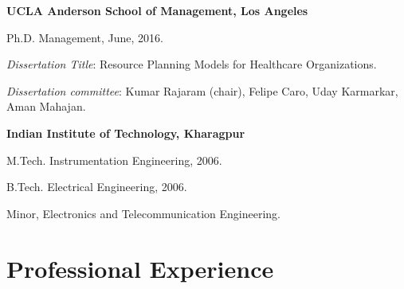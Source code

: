 \documentclass[11pt,a4paper]{article}
\renewenvironment{itemize}{
	\begin{list}{}{
			\setlength{\leftmargin}{1.5em}
		}
	}{
\end{list}
}
\begin{document}
	\begin{itemize}
		\item \textbf{UCLA Anderson School of Management, Los Angeles}
		\begin{itemize}
			\item Ph.D. Management,  June, 2016.
			\item \emph{Dissertation Title}: Resource Planning Models for Healthcare Organizations.
			\item \emph{Dissertation committee}: Kumar Rajaram (chair), Felipe Caro, Uday Karmarkar, {Aman Mahajan}.
		\end{itemize}
		\item \textbf{Indian Institute of Technology, Kharagpur}
		\begin{itemize}
			\item M.Tech. Instrumentation Engineering, 2006.
			\item B.Tech. Electrical Engineering, 2006.
			\begin{itemize}
			\item[\textendash] Minor, Electronics and Telecommunication Engineering.
		\end{itemize}
		\end{itemize}




	\end{itemize}


	\section*{\textbf{Professional Experience}}
\end{document}
